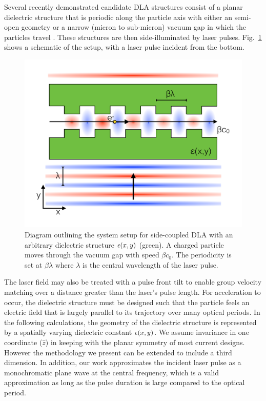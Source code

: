 Several recently demonstrated candidate DLA structures consist of a planar dielectric structure that is periodic along the particle axis with either an semi-open geometry or a narrow (micron to sub-micron) vacuum gap in which the particles travel \cite{plettner2006proposed, peralta2013demonstration, mcneur2016elements, leedle2015dielectric, chang2014silicon, breuer2014dielectric, breuer2014dielectric2, kozak2016dielectric}.
These structures are then side-illuminated by laser pulses. Fig.~\ref{fig:system} shows a schematic of the setup, with a laser pulse incident from the bottom.

\begin{figure}[htb!]
\centering\includegraphics[width=\textwidth]{figures/DLA_definition.pdf}
\caption{Diagram outlining the system setup for side-coupled DLA with an arbitrary dielectric structure $\epsilon(x,y)$ (green).  A charged particle moves through the vacuum gap with speed $\beta c_0$.  The periodicity is set at $\beta \lambda$ where $\lambda$ is the central wavelength of the laser pulse.}
\label{fig:system}
\end{figure}

The laser field may also be treated with a pulse front tilt \cite{hebling1996derivation, akturk2004pulse} to enable group velocity matching over a distance greater than the laser's pulse length.
For acceleration to occur, the dielectric structure must be designed such that the particle feels an electric field that is largely parallel to its trajectory over many optical periods.
In the following calculations, the geometry of the dielectric structure is represented by a spatially varying dielectric constant $\epsilon(x,y)$.  We assume invariance in one coordinate ($\hat{z}$) in keeping with the planar symmetry of most current designs.
However the methodology we present can be extended to include a third dimension.
In addition, our work approximates the incident laser pulse as a monochromatic plane wave at the central frequency, which is a valid approximation as long as the pulse duration is large compared to the optical period.

